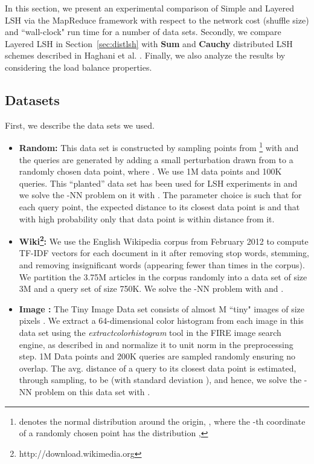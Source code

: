 \documentclass{acm_proc_article-sp}
\numberwithin{equation}{section}
\numberwithin{figure}{section}
\begin{document}
In this section, we present an experimental comparison of Simple and Layered LSH via the MapReduce framework with respect to the network cost (shuffle size) and ``wall-clock" run time for a number of data sets. Secondly, we compare Layered LSH in Section~\ref{sec:distlsh} with {\bf Sum} and {\bf Cauchy} distributed LSH schemes described in Haghani et al. \cite{Haghani}. Finally, we also analyze the results by considering the load balance properties.  

\subsection{Datasets} 
First, we describe the data sets we used.   
\begin{itemize}
\item{ \bf Random:}  
This data set is constructed by sampling points from \footnote{ denotes the normal distribution around the origin, , where the -th coordinate of a randomly chosen point has the distribution , } with  and the queries are generated by adding a small perturbation drawn from  to a randomly chosen data point, where . We use 1M data points and 100K queries. This ``planted'' data set has been used for LSH experiments in \cite{DIIM04} and we solve the -NN problem on it with . The parameter choice is such that for each query point, the expected distance to its closest data point is  and that with high probability only that data point is within distance  from it.





\item{\bf Wiki\footnote{http://download.wikimedia.org}:}
We use the English Wikipedia corpus from February 2012 to compute TF-IDF vectors for each document in it after removing stop words, stemming, and removing insignificant words (appearing fewer than  times in the corpus). We partition the 3.75M articles in the corpus randomly into a data set of size 3M and a query set of size 750K. We solve the -NN problem with  and . 

\item{\bf Image \cite{TinyImages}:} 
The Tiny Image Data set consists of almost M ``tiny" images of size  pixels \cite{TinyImages}. We extract a 64-dimensional color histogram from each image in this data set using the {\it extractcolorhistogram} tool in the FIRE image search engine, as described in \cite{Charikar:multiprobe, Fire} and normalize it to unit norm in the preprocessing step. 1M Data points and 200K queries are sampled randomly ensuring no overlap. The avg. distance of a query to its closest data point is estimated, through sampling, to be  (with standard deviation ), and hence, we solve the -NN problem on this data set with .  
\end{itemize}
\end{document}
